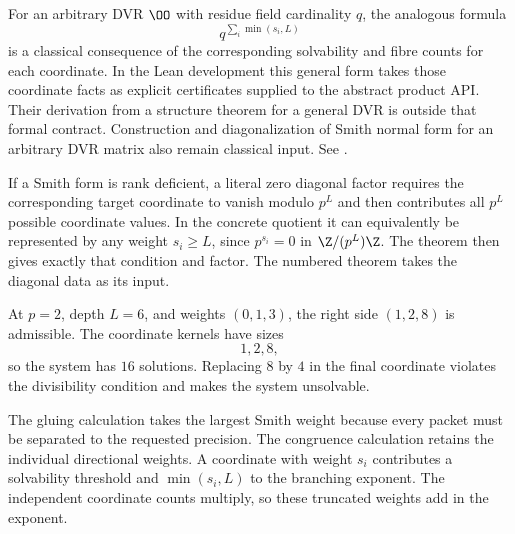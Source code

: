 For an arbitrary DVR $\OO$ with residue field cardinality $q$, the analogous
formula
\[
q^{\sum_i\min(s_i,L)}
\]
is a classical consequence of the corresponding solvability and fibre counts
for each coordinate. In the Lean development this general form takes those
coordinate facts as explicit certificates supplied to the abstract product
API. Their derivation from a structure theorem for a general DVR is outside
that formal contract. Construction and diagonalization of Smith normal form
for an arbitrary DVR matrix also remain classical input. See
\cite{Serre1979,Lang2002}.

If a Smith form is rank deficient, a literal zero diagonal factor requires
the corresponding target coordinate to vanish modulo $p^L$ and then
contributes all $p^L$ possible coordinate values. In the concrete quotient it
can equivalently be represented by any weight $s_i\ge L$, since
$p^{s_i}=0$ in $\Z/(p^L)\Z$. The theorem then gives exactly that condition and
factor. The numbered theorem takes the diagonal data as its input.

\begin{example}
At $p=2$, depth $L=6$, and weights $(0,1,3)$, the right side $(1,2,8)$ is admissible. The coordinate kernels have sizes
\[
1,2,8,
\]
so the system has $16$ solutions. Replacing $8$ by $4$ in the final coordinate violates the divisibility condition and makes the system unsolvable.
\end{example}

\begin{interpretation}
The gluing calculation takes the largest Smith weight because every packet must be separated to the requested precision. The congruence calculation retains the individual directional weights. A coordinate with weight $s_i$ contributes a solvability threshold and $\min(s_i,L)$ to the branching exponent. The independent coordinate counts multiply, so these truncated weights add in the exponent.
\end{interpretation}


